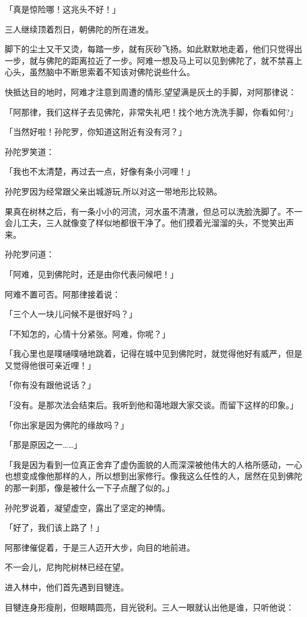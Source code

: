 \documentclass[twoside,openany]{book}
\begin{document}
「真是惊险哪！这兆头不好！」

三人继续顶着烈日，朝佛陀的所在进发。

脚下的尘土又干又烫，每踏一步，就有灰砂飞扬。如此默默地走着，他们只觉得出一步，就与佛陀的距离拉近了一步。阿难一想及马上可以见到佛陀了，就不禁喜上心头，虽然脑中不断思索着不知该对佛陀说些什么。

快抵达目的地时，阿难才注意到周遭的情形,望望满是灰土的手脚，对阿那律说：

「阿那律，我们这样子去见佛陀，非常失礼吧！找个地方洗洗手脚，你看如何?」

「当然好啦！孙陀罗，你知道这附近有没有河？」

孙陀罗笑道：

「我也不太清楚，再过去一点，好像有条小河哩！」

孙陀罗因为经常跟父亲出城游玩,所以对这一带地形比较熟。

果真在树林之后，有一条小小的河流，河水虽不清澈，但总可以洗脸洗脚了。不一会儿工夫，三人就像变了样似地都很干净了。他们摸着光溜溜的头，不觉笑出声来。

孙陀罗问道：

「阿难，见到佛陀时，还是由你代表问候吧！」

阿难不置可否。阿那律接着说：

「三个人一块儿问候不是很好吗？」

「不知怎的，心情十分紧张。阿难，你呢？」

「我心里也是噗嗵噗嗵地跳着，记得在城中见到佛陀时，就觉得他好有威严，但是又觉得他很可亲近哩！」

「你有没有跟他说话？」

「没有。是那次法会结束后。我听到他和蔼地跟大家交谈。而留下这样的印象。」

「你出家是因为佛陀的缘故吗？」

「那是原因之一……」

「我是因为看到一位真正舍弃了虚伪面貌的人而深深被他伟大的人格所感动，一心也想变成像他那样的人，所以想到出家修行。像我这么任性的人，居然在见到佛陀的那一刹那，像是被什么一下子点醒了似的。」

孙陀罗说着，凝望虚空，露出了坚定的神情。

「好了，我们该上路了！」

阿那律催促着，于是三人迈开大步，向目的地前进。

不一会儿，尼拘陀树林已经在望。

进入林中，他们首先遇到目犍连。

目犍连身形瘦削，但眼睛圆亮，目光锐利。三人一眼就认出他是谁，只听他说：
\end{document}
